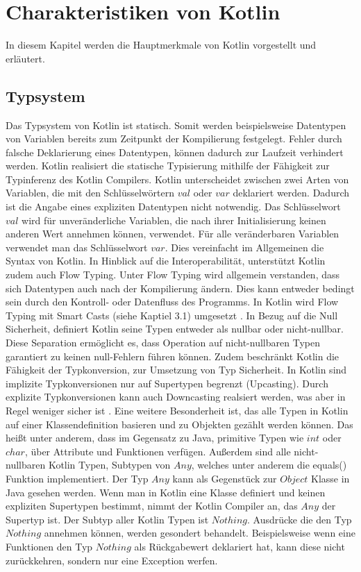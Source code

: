 \documentclass{article}
\begin{document}
\section{Charakteristiken von Kotlin}
In diesem Kapitel werden die Hauptmerkmale von Kotlin vorgestellt und erläutert.
\subsection{Typsystem}
Das Typsystem von Kotlin ist statisch. Somit werden beispielsweise Datentypen von Variablen bereits zum Zeitpunkt der Kompilierung festgelegt. Fehler durch falsche Deklarierung eines Datentypen, können dadurch zur Laufzeit verhindert werden. Kotlin realisiert die statische Typisierung mithilfe der Fähigkeit zur Typinferenz des Kotlin Compilers. Kotlin unterscheidet zwischen zwei Arten von Variablen, die mit den Schlüsselwörtern $val$ oder $var$ deklariert werden.  Dadurch ist die Angabe eines expliziten Datentypen nicht notwendig. Das Schlüsselwort $val$ wird für unveränderliche Variablen, die nach ihrer Initialisierung keinen anderen Wert annehmen können, verwendet. Für alle veränderbaren Variablen verwendet man das Schlüsselwort $var$. Dies vereinfacht im Allgemeinen die Syntax von Kotlin. In Hinblick auf die Interoperabilität, unterstützt Kotlin zudem auch Flow Typing. Unter Flow Typing wird allgemein verstanden, dass sich Datentypen auch nach der Kompilierung ändern. Dies kann entweder bedingt sein durch den Kontroll- oder Datenfluss des Programms. In Kotlin wird Flow Typing mit Smart Casts (siehe Kaptiel 3.1) umgesetzt \cite{KotlinLangSpec}. \newline
In Bezug auf die Null Sicherheit, definiert Kotlin seine Typen entweder als nullbar oder nicht-nullbar. Diese Separation ermöglicht es, dass Operation auf nicht-nullbaren Typen garantiert zu keinen null-Fehlern führen können. Zudem beschränkt Kotlin die Fähigkeit der Typkonversion, zur Umsetzung von Typ Sicherheit. In Kotlin sind implizite Typkonversionen nur auf Supertypen begrenzt (Upcasting). Durch explizite Typkonversionen kann auch Downcasting realsiert werden, was aber in Regel weniger sicher ist \cite{KotlinLangSpec}.\newline
Eine weitere Besonderheit ist, das alle Typen in Kotlin auf einer Klassendefinition basieren und zu Objekten gezählt werden können. Das heißt unter anderem, dass im Gegensatz zu Java, primitive Typen wie $int$ oder $char$, über Attribute und Funktionen verfügen. Außerdem sind alle nicht-nullbaren Kotlin Typen, Subtypen von $Any$, welches unter anderem die equals() Funktion implementiert. Der Typ $Any$ kann als Gegenstück zur $Object$ Klasse in Java gesehen werden. Wenn man in Kotlin eine Klasse definiert und keinen expliziten Supertypen bestimmt, nimmt der Kotlin Compiler an, das $Any$ der Supertyp ist. Der Subtyp aller Kotlin Typen ist $Nothing$. Ausdrücke die den Typ $Nothing$ annehmen können, werden gesondert behandelt. Beispielsweise wenn eine Funktionen den Typ $Nothing$ als Rückgabewert deklariert hat, kann diese nicht zurückkehren, sondern nur eine Exception werfen. \cite{KotlinLangSpec}
\end{document}
